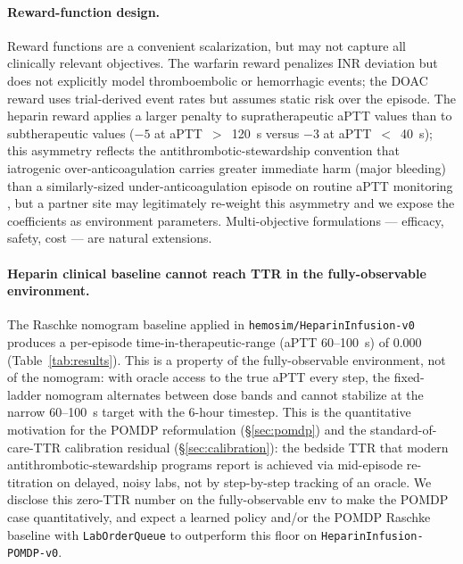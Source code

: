 \documentclass[11pt]{article}
\begin{document}
\paragraph{Reward-function design.} Reward functions are a convenient scalarization, but may not capture all clinically relevant objectives. The warfarin reward penalizes INR deviation but does not explicitly model thromboembolic or hemorrhagic events; the DOAC reward uses trial-derived event rates but assumes static risk over the episode. The heparin reward applies a larger penalty to supratherapeutic aPTT values than to subtherapeutic values ($-5$ at aPTT~$>$~120~s versus $-3$ at aPTT~$<$~40~s); this asymmetry reflects the antithrombotic-stewardship convention that iatrogenic over-anticoagulation carries greater immediate harm (major bleeding) than a similarly-sized under-anticoagulation episode on routine aPTT monitoring \citep{holbrook2012}, but a partner site may legitimately re-weight this asymmetry and we expose the coefficients as environment parameters. Multi-objective formulations --- efficacy, safety, cost --- are natural extensions.

\paragraph{Heparin clinical baseline cannot reach TTR in the fully-observable environment.} The Raschke nomogram baseline applied in \texttt{hemosim/HeparinInfusion-v0} produces a per-episode time-in-therapeutic-range (aPTT 60--100~s) of $0.000$ (Table~\ref{tab:results}). This is a property of the fully-observable environment, not of the nomogram: with oracle access to the true aPTT every step, the fixed-ladder nomogram alternates between dose bands and cannot stabilize at the narrow 60--100~s target with the 6-hour timestep. This is the quantitative motivation for the POMDP reformulation (\S\ref{sec:pomdp}) and the standard-of-care-TTR calibration residual (\S\ref{sec:calibration}): the bedside TTR that modern antithrombotic-stewardship programs report is achieved via mid-episode re-titration on delayed, noisy labs, not by step-by-step tracking of an oracle. We disclose this zero-TTR number on the fully-observable env to make the POMDP case quantitatively, and expect a learned policy and/or the POMDP Raschke baseline with \texttt{LabOrderQueue} to outperform this floor on \texttt{HeparinInfusion-POMDP-v0}.
\end{document}
